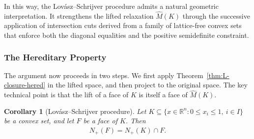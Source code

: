 \documentclass{article}
\newtheorem{corollary}{Corollary}
\newcommand{\R}{\mathbb{R}}
\begin{document}
In this way, the Lov\'asz--Schrijver procedure admits a natural geometric interpretation. It strengthens the lifted relaxation $\hat M(K)$ through the successive application of intersection cuts derived from a family of lattice-free convex sets that enforce both the diagonal equalities and the positive semidefinite constraint.

\subsubsection{The Hereditary Property} \label{subsec:ls-hered}

The argument now proceeds in two steps. We first apply Theorem~\ref{thm:L-closure-hered} in the lifted space, and then project to the original space. The key technical point is that the lift of a face of $K$ is itself a face of $\hat M(K)$.

\begin{corollary}[Lov\'asz--Schrijver procedure] \label{cor:ls-hered}
    Let $K \subseteq \{x \in \R^n : 0 \leq x_i \leq 1,\ i \in I\}$ be a convex set, and let $F$ be a face of $K$. Then
    \begin{align}
        N_+(F) = N_+(K) \cap F.
    \end{align}
\end{corollary}
\end{document}
